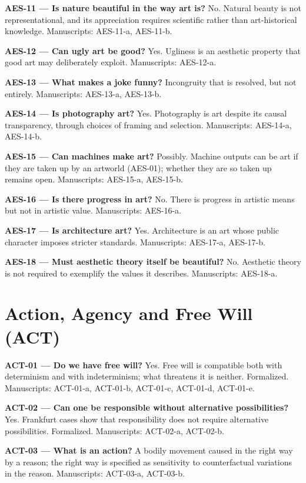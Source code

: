 \documentclass[10pt]{article}
\begin{document}
\textbf{AES-11 --- Is nature beautiful in the way art is?} No. Natural beauty is not representational, and its appreciation requires scientific rather than art-historical knowledge. Manuscripts: AES-11-a, AES-11-b.

\textbf{AES-12 --- Can ugly art be good?} Yes. Ugliness is an aesthetic property that good art may deliberately exploit. Manuscripts: AES-12-a.

\textbf{AES-13 --- What makes a joke funny?} Incongruity that is resolved, but not entirely. Manuscripts: AES-13-a, AES-13-b.

\textbf{AES-14 --- Is photography art?} Yes. Photography is art despite its causal transparency, through choices of framing and selection. Manuscripts: AES-14-a, AES-14-b.

\textbf{AES-15 --- Can machines make art?} Possibly. Machine outputs can be art if they are taken up by an artworld (AES-01); whether they are so taken up remains open. Manuscripts: AES-15-a, AES-15-b.

\textbf{AES-16 --- Is there progress in art?} No. There is progress in artistic means but not in artistic value. Manuscripts: AES-16-a.

\textbf{AES-17 --- Is architecture art?} Yes. Architecture is an art whose public character imposes stricter standards. Manuscripts: AES-17-a, AES-17-b.

\textbf{AES-18 --- Must aesthetic theory itself be beautiful?} No. Aesthetic theory is not required to exemplify the values it describes. Manuscripts: AES-18-a.

\section*{Action, Agency and Free Will (ACT)}
\textbf{ACT-01 --- Do we have free will?} Yes. Free will is compatible both with determinism and with indeterminism; what threatens it is neither. Formalized. Manuscripts: ACT-01-a, ACT-01-b, ACT-01-c, ACT-01-d, ACT-01-e.

\textbf{ACT-02 --- Can one be responsible without alternative possibilities?} Yes. Frankfurt cases show that responsibility does not require alternative possibilities. Formalized. Manuscripts: ACT-02-a, ACT-02-b.

\textbf{ACT-03 --- What is an action?} A bodily movement caused in the right way by a reason; the right way is specified as sensitivity to counterfactual variations in the reason. Manuscripts: ACT-03-a, ACT-03-b.
\end{document}
